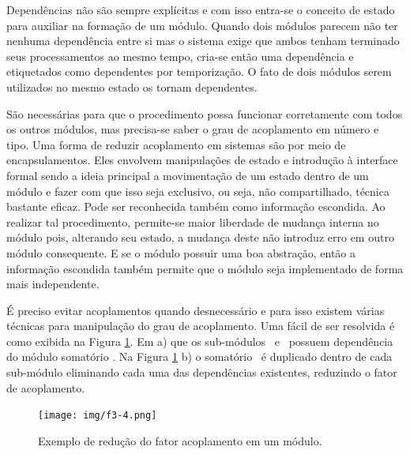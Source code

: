 		Dependências não são sempre explícitas e com isso entra-se o conceito de estado para auxiliar na formação de um módulo.
		Quando dois módulos parecem não ter nenhuma dependência entre si mas o sistema exige que ambos tenham terminado seus processamentos ao mesmo tempo, cria-se então uma dependência e etiquetados como dependentes por temporização. O fato de dois módulos serem utilizados no mesmo estado os tornam dependentes.

		São necessárias para que o procedimento possa funcionar corretamente com todos os outros módulos, mas precisa-se saber o grau de acoplamento em número e tipo.
		Uma forma de reduzir acoplamento em sistemas são por meio de encapsulamentos. Eles envolvem manipulações de estado e introdução à interface formal sendo a ideia principal a movimentação de um estado dentro de um módulo e fazer com que isso seja exclusivo, ou seja, não compartilhado, técnica bastante eficaz. Pode ser reconhecida também como informação escondida.
		Ao realizar tal procedimento, permite-se maior liberdade de mudança interna no módulo pois, alterando seu estado, a mudança deste não introduz erro em outro módulo consequente. E se o módulo possuir uma boa abstração, então a informação escondida também permite que o módulo seja implementado de forma mais independente.

		É preciso evitar acoplamentos quando desnecessário e para isso existem várias técnicas para manipulação do grau de acoplamento. Uma fácil de ser resolvida é como exibida na Figura \ref{fig:acoplamento}. Em a) que os sub-módulos \B\ e \C\ possuem dependência do módulo somatório \A. Na Figura \ref{fig:acoplamento} b) o somatório \A\ é duplicado dentro de cada sub-módulo eliminando cada uma das dependências existentes, reduzindo o fator de acoplamento.

		\begin{figure}[h] \centering
			\texttt{[image: img/f3-4.png]}
			\caption{Exemplo de redução do fator acoplamento em um módulo.}
			\label{fig:acoplamento}
		\end{figure}



